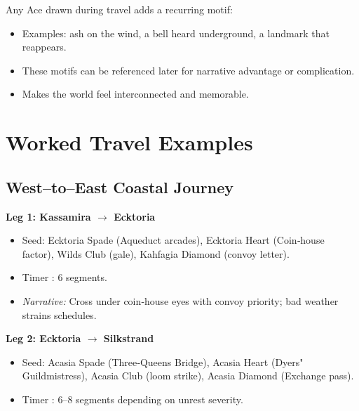 Any Ace drawn during travel adds a recurring motif:
\begin{itemize}
    \item Examples: ash on the wind, a bell heard underground, a landmark that reappears.
    \item These motifs can be referenced later for narrative advantage or complication.
    \item Makes the world feel interconnected and memorable.
\end{itemize}

\section{Worked Travel Examples}\label{sec:worked_examples}

\subsection{West--to--East Coastal Journey}\label{subsec:coastal_journey}

\textbf{Leg 1: Kassamira $\rightarrow$ Ecktoria}
\begin{itemize}
    \item Seed: Ecktoria Spade (Aqueduct arcades), Ecktoria Heart (Coin‑house factor), Wilds Club (gale), Kahfagia Diamond (convoy letter).
    \item Timer : 6 segments.
    \item \textit{Narrative:} Cross under coin‑house eyes with convoy priority; bad weather strains schedules.
\end{itemize}

\textbf{Leg 2: Ecktoria $\rightarrow$ Silkstrand}
\begin{itemize}
    \item Seed: Acasia Spade (Three‑Queens Bridge), Acasia Heart (Dyers" Guildmistress), Acasia Club (loom strike), Acasia Diamond (Exchange pass).
    \item Timer : 6--8 segments depending on unrest severity.
\end{itemize}


